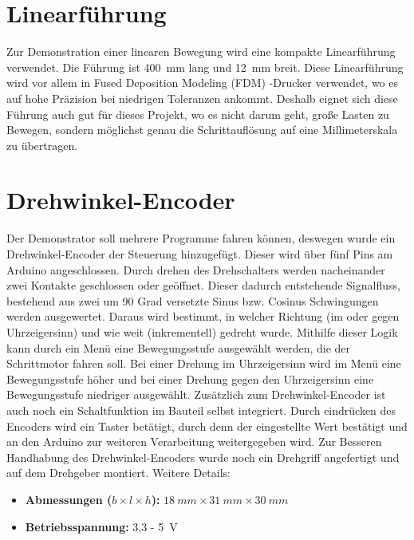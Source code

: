 \section{Linearführung}
Zur Demonstration einer linearen Bewegung wird eine kompakte Linearführung verwendet. Die Führung ist 400\ mm lang und 12\ mm breit. Diese Linearführung wird vor allem in Fused Deposition Modeling (FDM) -Drucker verwendet, wo es auf hohe Präzision bei niedrigen Toleranzen ankommt. Deshalb eignet sich diese Führung auch gut für dieses Projekt, wo es nicht darum geht, große Lasten zu Bewegen, sondern möglichst genau die Schrittauflösung auf eine Millimeterskala zu übertragen.

\section{Drehwinkel-Encoder}
Der Demonstrator soll mehrere Programme fahren können, deswegen wurde ein Drehwinkel-Encoder der Steuerung hinzugefügt. Dieser wird über fünf Pins am Arduino angeschlossen. Durch drehen des Drehschalters werden nacheinander zwei Kontakte geschlossen oder geöffnet. Dieser dadurch entstehende Signalfluss, bestehend aus zwei um 90 Grad versetzte Sinus bzw. Cosinus Schwingungen werden ausgewertet. Daraus wird bestimmt, in welcher Richtung (im oder gegen Uhrzeigersinn) und wie weit (inkrementell) gedreht wurde. Mithilfe dieser Logik kann durch ein Menü eine Bewegungsstufe ausgewählt werden, die der Schrittmotor fahren soll.\cite{Basler.2016} Bei einer Drehung im Uhrzeigersinn wird im Menü eine Bewegungsstufe höher und bei einer Drehung gegen den Uhrzeigersinn eine Bewegungsstufe niedriger ausgewählt. Zusätzlich zum Drehwinkel-Encoder ist auch noch ein Schaltfunktion im Bauteil selbst integriert. Durch eindrücken des Encoders wird ein Taster betätigt, durch denn der eingestellte Wert bestätigt und an den Arduino zur weiteren Verarbeitung weitergegeben wird. Zur Besseren Handhabung des Drehwinkel-Encoders wurde noch ein Drehgriff angefertigt und auf dem Drehgeber montiert.
Weitere Details: \begin{itemize}
	\item \textbf{Abmessungen ($b \times l \times h$):} $18 \ mm \times 31 \ mm \times 30 \ mm$
	\item \textbf{Betriebsspannung:} 3,3 - 5\ V
	\cite{SimacElec.2019}
\end{itemize}
